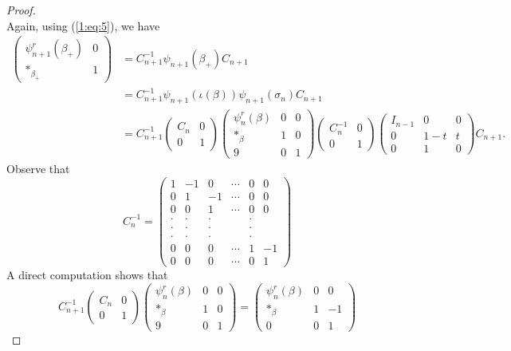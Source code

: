 \begin{proof}
\begin{displaymath}
\end{displaymath}
Again, using (\ref{1:eq:5}), we have
\begin{align*}
  \begin{pmatrix} \psi_{n+1}^r (\beta_+) & 0 \\ *_{\beta_+} & 1 \end{pmatrix} &= C_{n+1}^{-1} \psi_{n+1}(\beta_+) C_{n+1} \\
                                         &= C_{n+1}^{-1}\psi_{n+1}(\iota(\beta)) \psi_{n+1}(\sigma_n) C_{n+1} \\
  &= C_{n+1}^{-1} \begin{pmatrix} C_n & 0 \\ 0 & 1 \end{pmatrix} \begin{pmatrix} \psi_n^r(\beta) & 0 & 0 \\ *_{\beta} & 1 & 0 \\ 9 & 0 & 1 \end{pmatrix} \begin{pmatrix} C_n^{-1} & 0 \\ 0 & 1 \end{pmatrix} \begin{pmatrix} I_{n-1} & 0 & 0 \\ 0 & 1-t & t \\ 0 & 1 & 0 \end{pmatrix} C_{n+1}.
\end{align*}
Observe that 
\begin{displaymath}
  C_n^{-1} = \begin{pmatrix} 1 & -1 & 0 & \cdots & 0 & 0 \\
    0 & 1 & -1 & \cdots & 0 & 0 \\
    0 & 0 & 1 & \cdots & 0 & 0 \\
    \cdot & \cdot & \cdot & & \cdot & \\
    \cdot & \cdot & \cdot & & \cdot & \\
    \cdot & \cdot & \cdot & & \cdot & \\
    0 & 0 & 0 & \cdots & 1 & -1 \\
    0 & 0 & 0 & \cdots & 0 & 1
  \end{pmatrix}
\end{displaymath}
A direct computation shows that 
\begin{displaymath}
C_{n+1}^{-1} \begin{pmatrix} C_n & 0 \\ 0 & 1 \end{pmatrix} \begin{pmatrix} \psi_n^r(\beta) & 0 & 0 \\ *_{\beta} & 1 & 0 \\ 9 & 0 & 1 \end{pmatrix} = \begin{pmatrix} \psi_n^r(\beta) & 0 & 0 \\ *_{\beta} & 1 & -1 \\ 0 & 0 & 1 \end{pmatrix}

\end{displaymath}
\end{proof}
